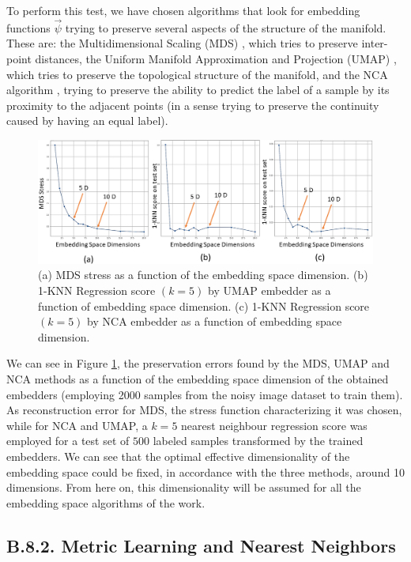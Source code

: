 \documentclass[11pt, a4paper, twoside]{article} %
\begin{document}
To perform this test, we have chosen algorithms that look for embedding functions $\vec{\psi}$ trying to preserve several aspects of the structure of the manifold. These are: the Multidimensional Scaling (MDS) \cite{MDS}, which tries to preserve inter-point distances, the Uniform Manifold Approximation and Projection (UMAP) \cite{umap}, which tries to preserve the topological structure of the manifold, and the NCA algorithm \cite{NCA}, trying to preserve the ability to predict the label of a sample by its proximity to the adjacent points (in a sense trying to preserve the continuity caused by having an equal label).

\begin{figure}[h!] 
     \centering 
    \includegraphics[width=0.8\linewidth]{dim.PNG}
    \caption{(a) MDS stress as a function of the embedding space dimension. (b)  1-KNN Regression score $(k=5)$ by UMAP embedder as a function of embedding space dimension. (c)  1-KNN Regression score $(k=5)$ by NCA embedder as a function of embedding space dimension. }
        \label{fig:dimension}
\end{figure}

We can see in Figure \ref{fig:dimension}, the preservation errors found by the MDS, UMAP and NCA methods as a function of the embedding space dimension of the obtained embedders (employing 2000 samples from the noisy image dataset to train them). As reconstruction error for MDS, the stress function characterizing it was chosen, while for NCA and UMAP, a $k=5$ nearest neighbour regression score was employed for a test set of $500$ labeled samples transformed by the trained embedders. We can see that the optimal effective dimensionality of the embedding space could be fixed, in accordance with the three methods, around 10 dimensions. From here on, this dimensionality will be assumed for all the embedding space algorithms of the work.
\vspace{-0.35cm}

\subsection*{B.8.2. Metric Learning and Nearest Neighbors}\vspace{-0.1cm}
\end{document}
